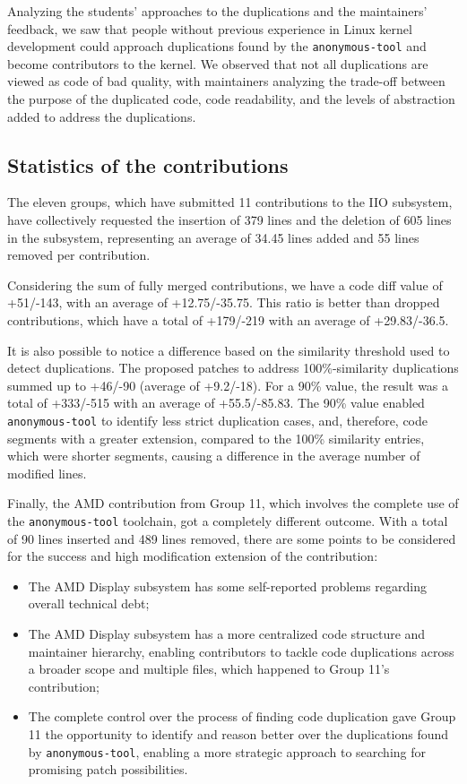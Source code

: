 \documentclass[12pt]{article}
\begin{document}
Analyzing the students' approaches to the duplications and the maintainers' feedback, we saw that people without previous experience in Linux kernel development could approach duplications found by the \texttt{anonymous-tool} and become contributors to the kernel. We observed that not all duplications 
are viewed as code of bad quality, with maintainers analyzing the trade-off between the purpose of the duplicated code, code readability, and the levels of abstraction added to address the duplications.

\subsection{Statistics of the contributions}

The eleven groups, which have submitted 11 contributions to the IIO subsystem, have collectively requested the insertion of 379 lines and the deletion of 605 lines in the subsystem, representing an average of 34.45 lines added and 55 lines removed per contribution.

Considering the sum of fully merged contributions, we have a code diff value of +51/-143, with an average of +12.75/-35.75. This ratio is better than dropped contributions, which have a total of +179/-219 with an average of +29.83/-36.5.

It is also possible to notice a difference based on the similarity threshold used to detect duplications. The proposed patches to address 100\%-similarity duplications summed up to +46/-90 (average of +9.2/-18). For a 90\% value, the result was a total of +333/-515 with an average of +55.5/-85.83. The 90\% value enabled \texttt{anonymous-tool} to identify less strict duplication cases, and, therefore, code segments with a greater extension, compared to the 100\% similarity entries, which were shorter segments, causing a difference in the average number of modified lines.

Finally, the AMD contribution from Group 11, which involves the complete use of the \texttt{anonymous-tool} toolchain, got a completely different outcome. With a total of 90 lines inserted and 489 lines removed, there are some points to be considered for the success and high modification extension of the contribution:

\begin{itemize}
    \item The AMD Display subsystem has some self-reported problems regarding overall technical debt;
    \item The AMD Display subsystem has a more centralized code structure and maintainer hierarchy, enabling contributors to tackle code duplications across a broader scope and multiple files, which happened to Group 11's contribution;
    \item The complete control over the process of finding code duplication gave Group 11 the opportunity to identify and reason better over the duplications found by \texttt{anonymous-tool}, enabling a more strategic approach to searching for promising patch possibilities. 
\end{itemize}
\end{document}
